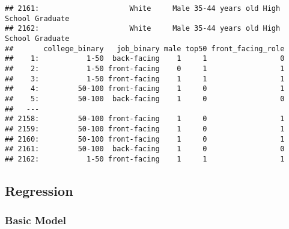 \documentclass[
]{article}
\newenvironment{Shaded}{\begin{snugshade}}{\end{snugshade}}
\newcommand{\AttributeTok}[1]{\textcolor[rgb]{0.77,0.63,0.00}{#1}}
\newcommand{\CommentTok}[1]{\textcolor[rgb]{0.56,0.35,0.01}{\textit{#1}}}
\newcommand{\FunctionTok}[1]{\textcolor[rgb]{0.00,0.00,0.00}{#1}}
\newcommand{\NormalTok}[1]{#1}
\newcommand{\OtherTok}[1]{\textcolor[rgb]{0.56,0.35,0.01}{#1}}
\newcommand{\SpecialCharTok}[1]{\textcolor[rgb]{0.00,0.00,0.00}{#1}}
\newcommand{\StringTok}[1]{\textcolor[rgb]{0.31,0.60,0.02}{#1}}
\begin{document}
\begin{verbatim}
## 2161:                     White     Male 35-44 years old High School Graduate
## 2162:                     White     Male 35-44 years old High School Graduate
##       college_binary   job_binary male top50 front_facing_role
##    1:           1-50  back-facing    1     1                 0
##    2:           1-50 front-facing    0     1                 1
##    3:           1-50 front-facing    1     1                 1
##    4:         50-100 front-facing    1     0                 1
##    5:         50-100  back-facing    1     0                 0
##   ---                                                         
## 2158:         50-100 front-facing    1     0                 1
## 2159:         50-100 front-facing    1     0                 1
## 2160:         50-100 front-facing    1     0                 1
## 2161:         50-100  back-facing    1     0                 0
## 2162:           1-50 front-facing    1     1                 1
\end{verbatim}

\hypertarget{regression}{%
\subsection{Regression}\label{regression}}

\hypertarget{basic-model}{%
\subsubsection{Basic Model}\label{basic-model}}

\begin{Shaded}
\end{Shaded}
\end{document}
